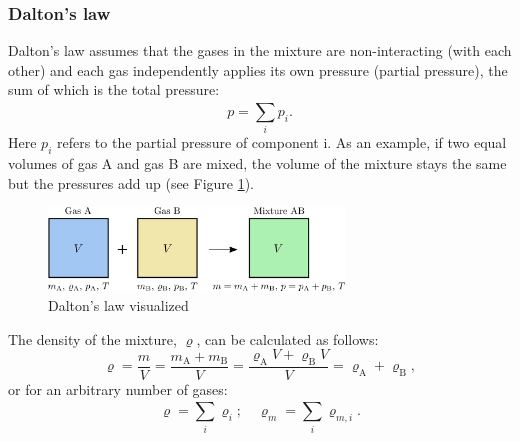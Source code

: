 \subsubsection{Dalton's law}
Dalton's law assumes that the gases in the mixture are non-interacting (with each other) and each gas independently applies its own pressure (partial pressure), the sum of which is the total pressure:
%
\begin{equation}
p = \sum_{i}^{}p_i.
\end{equation}
Here $p_i$ refers to the partial pressure of component i.
As an example, if two equal volumes of gas A and gas B are mixed, the volume of the mixture stays the same but the pressures add up (see Figure \ref{fig:dalton1}).
%
\begin{figure}[ht]
  \centering
  \includegraphics[width=0.7\textwidth]{png/dalton1.png}
  \caption{Dalton's law visualized}
  \label{fig:dalton1}
\end{figure}
%
The density of the mixture, $\varrho$, can be calculated as follows:
\begin{equation}
\varrho = \frac{m}{V} = \frac{m_\mathrm{A} + m_\mathrm{B}}{V} = \frac{\varrho_\mathrm{A} V + \varrho_\mathrm{B} V}{V} = \varrho_\mathrm{A} + \varrho_\mathrm{B},
\end{equation}
%
or for an arbitrary number of gases:
\begin{equation}
\varrho = \sum_{i}^{} \varrho_i ; \quad \varrho_m = \sum_{i}^{} \varrho_{m,i}.
\end{equation}
%
